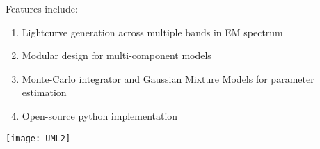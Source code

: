 \documentclass[landscape,a0paper,fontscale=0.285]{baposter} %
\newcommand{\compresslist}{ %
\setlength{\itemsep}{1pt}
\setlength{\parskip}{0pt}
\setlength{\parsep}{0pt}
}
\begin{document}
\begin{poster}
{Features include:
\begin{enumerate}\compresslist
\item Lightcurve generation across multiple bands in EM spectrum
\item Modular design for multi-component models
\item Monte-Carlo integrator and Gaussian Mixture Models for parameter estimation
\item Open-source python implementation
\end{enumerate}

\vspace{0.3em} %
}







{

\begin{multicols}{2}
\begin{center}
\texttt{[image: UML2]}
\end{center}

\end{multicols}

}
\end{poster}
\end{document}
